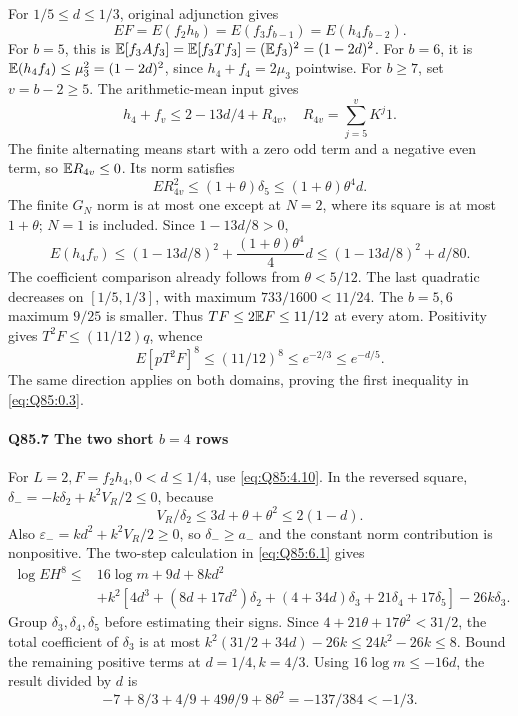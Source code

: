 For \(1/5\le\allowbreak  d\le\allowbreak 1/3\), original adjunction gives
\[
 EF=E(f_2h_b)=E(f_3f_{b-1})=E(h_4f_{b-2}).            \tag{Q85.6.3}\label{eq:Q85:6.3}
\]
For \(b=\allowbreak 5\), this is
\(\mathbb E[f_3Af_3]=\allowbreak \mathbb E[f_3Tf_3]=\allowbreak (\mathbb E f_3)^2=\allowbreak (1-2d)^2\).
For \(b=\allowbreak 6\), it is
\(\mathbb E(h_4f_4)\le\allowbreak \mu_3^2=\allowbreak (1-2d)^2\), since \(h_4+f_4=\allowbreak 2\mu_3\) pointwise.
For \(b\ge\allowbreak 7\), set \(v=\allowbreak b-2\ge\allowbreak 5\). The arithmetic-mean input gives
\[
 h_4+f_v\le2-13d/4+R_{4v},\quad
 R_{4v}=\sum_{j=5}^vK^j1.
\]
The finite alternating means start with a zero odd term and a negative even term, so
\(\mathbb E R_{4v}\le\allowbreak 0\). Its norm satisfies
\[
 ER_{4v}^2\le(1+\theta)\delta_5\le(1+\theta)\theta^4d.
\]
The finite \(G_N\) norm is at most one except at \(N=\allowbreak 2\), where its square is at most
\(1+\theta\); \(N=\allowbreak 1\) is included.
Since \(1-13d/8>\allowbreak 0\),
\[
 E(h_4f_v)\le(1-13d/8)^2+\frac{(1+\theta)\theta^4}{4}d
 \le(1-13d/8)^2+d/80.                                \tag{Q85.6.4}\label{eq:Q85:6.4}
\]
The coefficient comparison already follows from \(\theta<\allowbreak 5/12\).
The last quadratic decreases on \([1/5,\allowbreak 1/3]\), with maximum
\(733/1600<\allowbreak 11/24\). The \(b=\allowbreak 5,\allowbreak 6\) maximum \(9/25\) is smaller.
Thus \(TF\le\allowbreak 2\mathbb E F\le\allowbreak 11/12\) at every atom.
Positivity gives \(T^2F\le\allowbreak (11/12)q\), whence
\[
 E[pT^2F]^8\le(11/12)^8\le e^{-2/3}\le e^{-d/5}.      \tag{Q85.6.5}\label{eq:Q85:6.5}
\]
The same direction applies on both domains, proving the first inequality in \eqref{eq:Q85:0.3}.

\paragraph{Q85.7 The two short \(b=\allowbreak 4\) rows}
For \(L=\allowbreak 2,\allowbreak F=\allowbreak f_2h_4,\allowbreak 0<\allowbreak d\le\allowbreak 1/4\), use \eqref{eq:Q85:4.10}.
In the reversed square,
\(\delta_-=\allowbreak -k\delta_2+k^2V_R/2\le\allowbreak 0\), because
\[
 V_R/\delta_2\le3d+\theta+\theta^2\le2(1-d).
\]
Also \(\varepsilon_-=\allowbreak kd^2+k^2V_R/2\ge\allowbreak 0\), so
\(\delta_-\ge\allowbreak  a_-\) and the constant norm contribution is nonpositive.
The two-step calculation in \eqref{eq:Q85:6.1} gives
\[
\begin{aligned}
 \log EH^8\le{}&16\log m+9d+8kd^2\\
 &+k^2[4d^3+(8d+17d^2)\delta_2+(4+34d)\delta_3+21\delta_4+17\delta_5]
 -26k\delta_3.                                           
\end{aligned}
\tag{Q85.7.1}\label{eq:Q85:7.1}
\]
Group \(\delta_3,\allowbreak \delta_4,\allowbreak \delta_5\) before estimating their signs.
Since \(4+21\theta+17\theta^2<\allowbreak 31/2\), the total coefficient of \(\delta_3\) is at most
\(k^2(31/2+34d)-26k\le\allowbreak 24k^2-26k\le\allowbreak 8\).
Bound the remaining positive terms at \(d=\allowbreak 1/4,\allowbreak k=\allowbreak 4/3\).
Using \(16\log m\le\allowbreak -16d\), the result divided by \(d\) is
\[
 -7+8/3+4/9+49\theta/9+8\theta^2=-137/384<-1/3.       \tag{Q85.7.2}\label{eq:Q85:7.2}
\]

